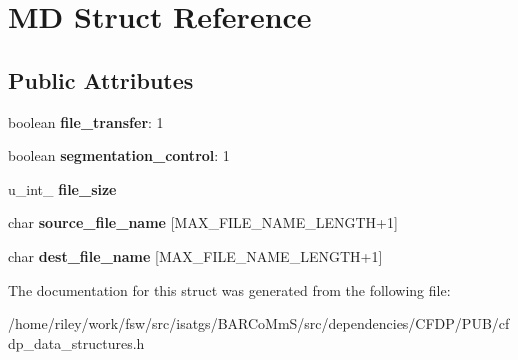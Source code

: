 \hypertarget{struct_m_d}{}\section{MD Struct Reference}
\label{struct_m_d}
\subsection*{Public Attributes}
\begin{DoxyCompactItemize}
\item 
boolean {\bfseries file\+\_\+transfer}\+: 1\hypertarget{struct_m_d_af43b09440cf76cde397e8d876c3a8130}{}\label{struct_m_d_af43b09440cf76cde397e8d876c3a8130}

\item 
boolean {\bfseries segmentation\+\_\+control}\+: 1\hypertarget{struct_m_d_a8483756b650d370a9f73c5eb67d5a981}{}\label{struct_m_d_a8483756b650d370a9f73c5eb67d5a981}

\item 
u\+\_\+int\+\_ {\bfseries file\+\_\+size}\hypertarget{struct_m_d_ab0d079723734fa10ae2e95e81e63f128}{}\label{struct_m_d_ab0d079723734fa10ae2e95e81e63f128}

\item 
char {\bfseries source\+\_\+file\+\_\+name} \mbox{[}M\+A\+X\+\_\+\+F\+I\+L\+E\+\_\+\+N\+A\+M\+E\+\_\+\+L\+E\+N\+G\+TH+1\mbox{]}\hypertarget{struct_m_d_aeb82449d4978e44cd985a0f9be799396}{}\label{struct_m_d_aeb82449d4978e44cd985a0f9be799396}

\item 
char {\bfseries dest\+\_\+file\+\_\+name} \mbox{[}M\+A\+X\+\_\+\+F\+I\+L\+E\+\_\+\+N\+A\+M\+E\+\_\+\+L\+E\+N\+G\+TH+1\mbox{]}\hypertarget{struct_m_d_a5a85cb4df082239b96234b800e174870}{}\label{struct_m_d_a5a85cb4df082239b96234b800e174870}

\end{DoxyCompactItemize}


The documentation for this struct was generated from the following file\+:\begin{DoxyCompactItemize}
\item 
/home/riley/work/fsw/src/isatgs/\+B\+A\+R\+Co\+Mm\+S/src/dependencies/\+C\+F\+D\+P/\+P\+U\+B/cfdp\+\_\+data\+\_\+structures.\+h\end{DoxyCompactItemize}
